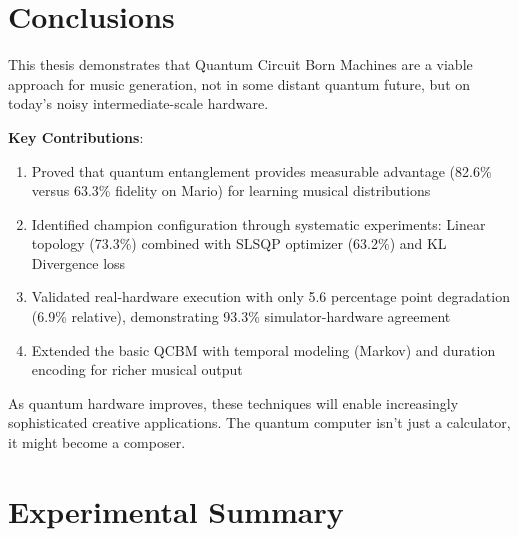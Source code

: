 \documentclass[11pt,a4paper]{article}
\begin{document}
\clearpage
\section{Conclusions}

This thesis demonstrates that Quantum Circuit Born Machines are a viable approach for music generation, not in some distant quantum future, but on today's noisy intermediate-scale hardware.

\textbf{Key Contributions}:
\begin{enumerate}
    \item Proved that quantum entanglement provides measurable advantage (82.6\% versus 63.3\% fidelity on Mario) for learning musical distributions
    \item Identified champion configuration through systematic experiments: Linear topology (73.3\%) combined with SLSQP optimizer (63.2\%) and KL Divergence loss
    \item Validated real-hardware execution with only 5.6 percentage point degradation (6.9\% relative), demonstrating 93.3\% simulator-hardware agreement
    \item Extended the basic QCBM with temporal modeling (Markov) and duration encoding for richer musical output
\end{enumerate}

As quantum hardware improves, these techniques will enable increasingly sophisticated creative applications. The quantum computer isn't just a calculator, it might become a composer.

\appendix
\section{Experimental Summary}
\end{document}
